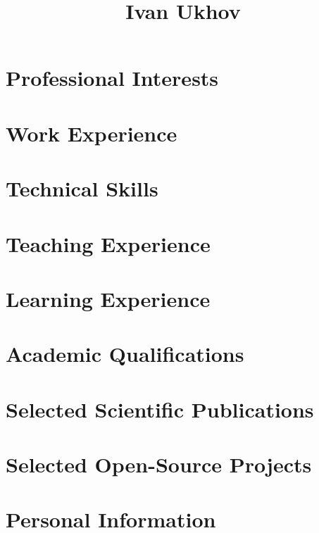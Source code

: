 \documentclass{article}
\title{Ivan Ukhov}
\begin{document}
\section{Professional Interests}
\section{Work Experience}
\section{Technical Skills}
\section{Teaching Experience}
\section{Learning Experience}
\section{Academic Qualifications}
\section{Selected Scientific Publications}
\section{Selected Open-Source Projects}
\section{Personal Information}
\end{document}
